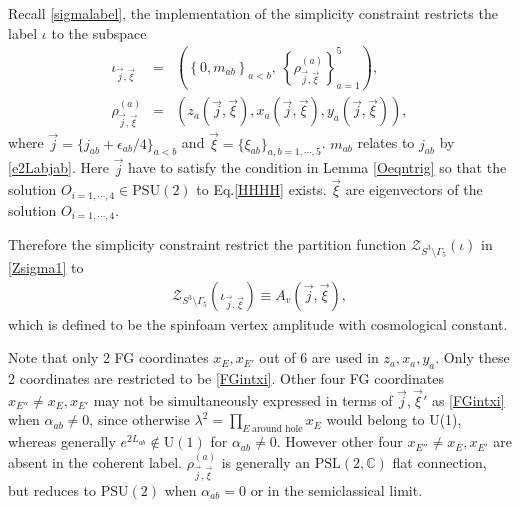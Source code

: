 \documentclass[aps,prd,notitlepage,nofootinbib,superscriptaddress,groupedaddress,twocolumn]{revtex4-1}
\newcommand{\PSlc}{\mathrm{PSL}(2,\mathbb{C})}
\newcommand{\PSu}{\mathrm{PSU}(2)}
\def\be{\begin{eqnarray}}
\def\ee{\end{eqnarray}}
\newcommand{\cs}{\mathcal S}
\newcommand{\cz}{\mathcal Z}
\renewcommand{\a}{\alpha}
\newcommand{\G}{\Gamma}
\renewcommand{\l}{\lambda}
\newcommand{\lt}{\left}
\newcommand{\rt}{\right}
\begin{document}


Recall \eqref{sigmalabel}, the implementation of the simplicity constraint restricts the label $\iota$ to the subspace
\be
\iota_{\vec{j},\vec{\xi}}&=&\lt(\lt\{0,m_{ab}\rt\}_{a<b},\ \lt\{\rho^{(a)}_{\vec{j},\vec{\xi}}\rt\}_{a=1}^5\rt),\nonumber\\
\rho^{(a)}_{\vec{j},\vec{\xi}}&=&\lt(z_a(\vec{j},\vec{\xi}),x_a(\vec{j},\vec{\xi}),y_a(\vec{j},\vec{\xi})\rt),\nonumber
\ee
where $\vec{j}=\{j_{ab}+\epsilon_{ab}/4\}_{a<b}$ and $\vec{\xi}=\{\xi_{ab}\}_{a,b=1,\cdots,5}$. $m_{ab}$ relates to $j_{ab}$ by \eqref{e2Labjab}. Here $\vec{j}$ have to satisfy the condition in Lemma \ref{Oeqntrig} so that the solution $O_{i=1,\cdots,4}\in\PSu$ to Eq.\eqref{HHHH} exists. $\vec{\xi}$ are eigenvectors of the solution $O_{i=1,\cdots,4}$. %


Therefore the simplicity constraint restrict the partition function $\cz_{S^3\setminus\G_5}(\iota)$ in \eqref{Zsigma1} to 
\be
\cz_{S^3\setminus\G_5}\lt(\iota_{\vec{j},\vec{\xi}}\rt)\equiv A_v(\vec{j},\vec{\xi}),
\ee
which is defined to be the spinfoam vertex amplitude with cosmological constant.


Note that only 2 FG coordinates $x_E,x_{E'}$ out of 6 are used in $z_a,x_a,y_a$. Only these 2 coordinates are restricted to be \eqref{FGintxi}. Other four FG coordinates $x_{E''}\neq x_E,x_{E'}$ may not be simultaneously expressed in terms of $\vec{j},\vec{\xi}'$ as \eqref{FGintxi} when $\a_{ab}\neq 0$, since otherwise $\l^2=\prod_{E\ \text{around hole}}x_E$ would belong to U(1), whereas generally $e^{2 L_{ab}}\not\in \mathrm{U(1)}$ for $\a_{ab}\neq 0$. %
However other four $x_{E''}\neq x_E,x_{E'}$ are absent in the coherent label. $\rho^{(a)}_{\vec{j},\vec{\xi}}$ is generally an $\PSlc$ flat connection, but reduces to $\PSu$ when $\a_{ab}=0$ or in the semiclassical limit.
\end{document}
